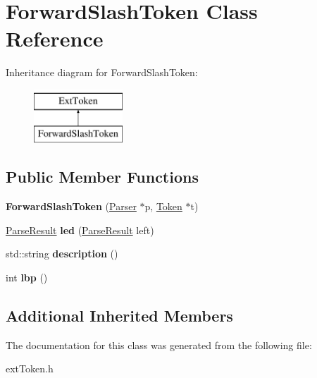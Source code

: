 \hypertarget{classForwardSlashToken}{\section{Forward\-Slash\-Token Class Reference}
\label{classForwardSlashToken}
}
Inheritance diagram for Forward\-Slash\-Token\-:\begin{figure}[H]
\begin{center}
\leavevmode
\includegraphics[height=2.000000cm]{classForwardSlashToken}
\end{center}
\end{figure}
\subsection*{Public Member Functions}
\begin{DoxyCompactItemize}
\item 
\hypertarget{classForwardSlashToken_ae818840269cd15f6f6b00929fb4eb979}{{\bfseries Forward\-Slash\-Token} (\hyperlink{classParser}{Parser} $\ast$p, \hyperlink{classToken}{Token} $\ast$t)}\label{classForwardSlashToken_ae818840269cd15f6f6b00929fb4eb979}

\item 
\hypertarget{classForwardSlashToken_ac2dda7b791ab555e4323f17baaf323e1}{\hyperlink{classParseResult}{Parse\-Result} {\bfseries led} (\hyperlink{classParseResult}{Parse\-Result} left)}\label{classForwardSlashToken_ac2dda7b791ab555e4323f17baaf323e1}

\item 
\hypertarget{classForwardSlashToken_ac27b1ab175ec08c468bd0d4c41636a5c}{std\-::string {\bfseries description} ()}\label{classForwardSlashToken_ac27b1ab175ec08c468bd0d4c41636a5c}

\item 
\hypertarget{classForwardSlashToken_ad65829044355922a291dfbfd3052b183}{int {\bfseries lbp} ()}\label{classForwardSlashToken_ad65829044355922a291dfbfd3052b183}

\end{DoxyCompactItemize}
\subsection*{Additional Inherited Members}


The documentation for this class was generated from the following file\-:\begin{DoxyCompactItemize}
\item 
ext\-Token.\-h\end{DoxyCompactItemize}
